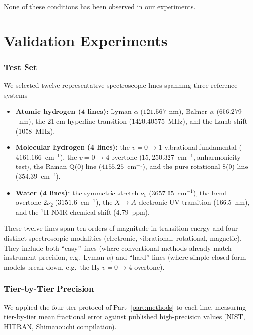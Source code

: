 \documentclass[twocolumn,11pt,a4paper]{article}
\theoremstyle{thmstyle}
\theoremstyle{axiomstyle}
\theoremstyle{definition}
\theoremstyle{remark}
\begin{document}
None of these conditions has been observed in our experiments.



\part{Validation Experiments}
\label{part:validation}

\section{Test Set}
\label{sec:testset}

We selected twelve representative spectroscopic lines spanning three reference systems:

\begin{itemize}[nosep]
\item \textbf{Atomic hydrogen (4 lines):} Lyman-$\alpha$ ($121.567$~nm), Balmer-$\alpha$ ($656.279$~nm), the 21 cm hyperfine transition ($1420.40575$~MHz), and the Lamb shift ($1058$~MHz).
\item \textbf{Molecular hydrogen (4 lines):} the $v=0\to 1$ vibrational fundamental ($4161.166$~cm$^{-1}$), the $v=0\to 4$ overtone ($15{,}250.327$~cm$^{-1}$, anharmonicity test), the Raman Q(0) line ($4155.25$~cm$^{-1}$), and the pure rotational S(0) line ($354.39$~cm$^{-1}$).
\item \textbf{Water (4 lines):} the symmetric stretch $\nu_{1}$ ($3657.05$~cm$^{-1}$), the bend overtone $2\nu_{2}$ ($3151.6$~cm$^{-1}$), the $X\to A$ electronic UV transition ($166.5$~nm), and the $^{1}$H NMR chemical shift ($4.79$~ppm).
\end{itemize}

These twelve lines span ten orders of magnitude in transition energy and four distinct spectroscopic modalities (electronic, vibrational, rotational, magnetic). They include both ``easy'' lines (where conventional methods already match instrument precision, e.g.\ Lyman-$\alpha$) and ``hard'' lines (where simple closed-form models break down, e.g.\ the H$_{2}$ $v=0\to 4$ overtone).

\section{Tier-by-Tier Precision}
\label{sec:tier_results}

We applied the four-tier protocol of Part~\ref{part:methods} to each line, measuring tier-by-tier mean fractional error against published high-precision values (NIST, HITRAN, Shimanouchi compilation).
\end{document}
